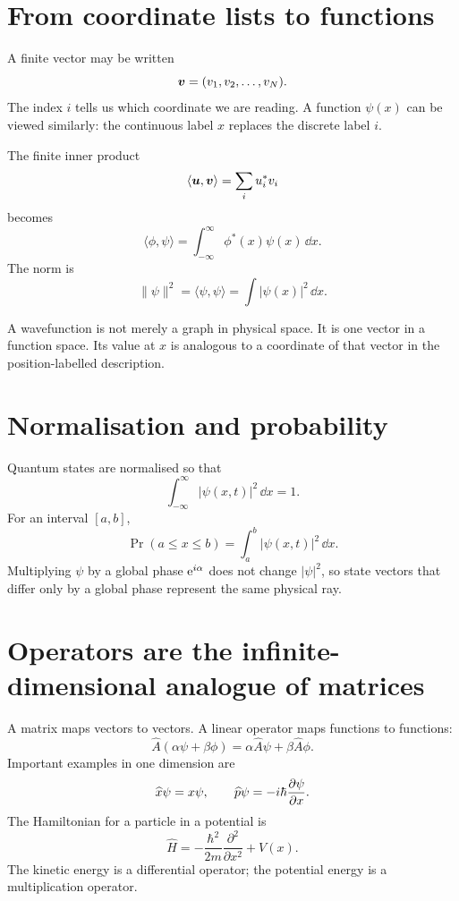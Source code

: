 \documentclass[11pt,a4paper]{article}
\begin{document}
\tableofcontents
\clearpage

\section{From coordinate lists to functions}

A finite vector may be written
\[
\bm{v}=(v_1,v_2,\ldots,v_N).
\]
The index $i$ tells us which coordinate we are reading. A function $\psi(x)$ can be viewed similarly: the continuous label $x$ replaces the discrete label $i$.

The finite inner product
\[
\langle\bm{u},\bm{v}\rangle=\sum_i u_i^*v_i
\]
becomes
\[
\boxed{\langle\phi,\psi\rangle
=\int_{-\infty}^{\infty}\phi^*(x)\psi(x)\,\dd x.}
\]
The norm is
\[
\|\psi\|^2=\langle\psi,\psi\rangle
=\int|\psi(x)|^2\,\dd x.
\]

\begin{intuition}
A wavefunction is not merely a graph in physical space. It is one vector in a function space. Its value at $x$ is analogous to a coordinate of that vector in the position-labelled description.
\end{intuition}

\section{Normalisation and probability}

Quantum states are normalised so that
\[
\boxed{\int_{-\infty}^{\infty}|\psi(x,t)|^2\,\dd x=1.}
\]
For an interval $[a,b]$,
\[
\Pr(a\le x\le b)=\int_a^b|\psi(x,t)|^2\,\dd x.
\]
Multiplying $\psi$ by a global phase $\mathrm e^{i\alpha}$ does not change $|\psi|^2$, so state vectors that differ only by a global phase represent the same physical ray.

\section{Operators are the infinite-dimensional analogue of matrices}

A matrix maps vectors to vectors. A linear operator maps functions to functions:
\[
\widehat A(\alpha\psi+\beta\phi)
=\alpha\widehat A\psi+\beta\widehat A\phi.
\]
Important examples in one dimension are
\[
\widehat x\psi=x\psi,
\qquad
\widehat p\psi=-i\hbar\frac{\partial \psi}{\partial x}.
\]
The Hamiltonian for a particle in a potential is
\[
\boxed{
\widehat H=-\frac{\hbar^2}{2m}\frac{\partial^2}{\partial x^2}+V(x).}
\]
The kinetic energy is a differential operator; the potential energy is a multiplication operator.
\end{document}
